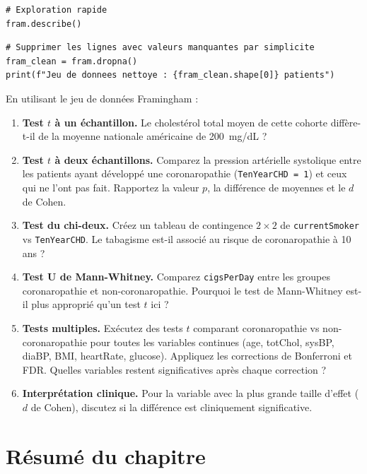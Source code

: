 \begin{verbatim}
# Exploration rapide
fram.describe()
\end{verbatim}

\begin{verbatim}
# Supprimer les lignes avec valeurs manquantes par simplicite
fram_clean = fram.dropna()
print(f"Jeu de donnees nettoye : {fram_clean.shape[0]} patients")
\end{verbatim}

\begin{exercise}
En utilisant le jeu de donn\'ees Framingham :
\begin{enumerate}
  \item \textbf{Test $t$ \`a un \'echantillon.} Le cholest\'erol total moyen de cette cohorte diff\`ere-t-il de la moyenne nationale am\'ericaine de 200~mg/dL ?
  \item \textbf{Test $t$ \`a deux \'echantillons.} Comparez la pression art\'erielle systolique entre les patients ayant d\'evelopp\'e une coronaropathie (\texttt{TenYearCHD = 1}) et ceux qui ne l'ont pas fait. Rapportez la valeur $p$, la diff\'erence de moyennes et le $d$ de Cohen.
  \item \textbf{Test du chi-deux.} Cr\'eez un tableau de contingence $2 \times 2$ de \texttt{currentSmoker} vs \texttt{TenYearCHD}. Le tabagisme est-il associ\'e au risque de coronaropathie \`a 10 ans ?
  \item \textbf{Test U de Mann-Whitney.} Comparez \texttt{cigsPerDay} entre les groupes coronaropathie et non-coronaropathie. Pourquoi le test de Mann-Whitney est-il plus appropri\'e qu'un test $t$ ici ?
  \item \textbf{Tests multiples.} Ex\'ecutez des tests $t$ comparant coronaropathie vs non-coronaropathie pour toutes les variables continues (age, totChol, sysBP, diaBP, BMI, heartRate, glucose). Appliquez les corrections de Bonferroni et FDR. Quelles variables restent significatives apr\`es chaque correction ?
  \item \textbf{Interpr\'etation clinique.} Pour la variable avec la plus grande taille d'effet ($d$ de Cohen), discutez si la diff\'erence est cliniquement significative.
\end{enumerate}
\end{exercise}

\section{R\'esum\'e du chapitre}


